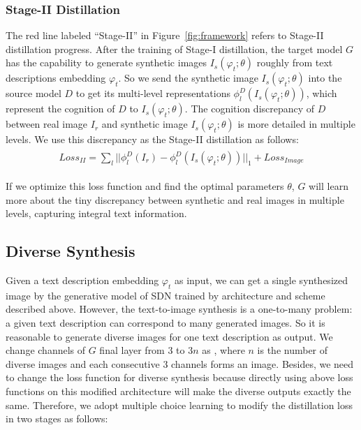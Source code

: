 \documentclass[sigconf]{acmart}
\begin{document}
\subsubsection{Stage-II Distillation}
The red line labeled ``Stage-II'' in Figure~\ref{fig:framework} refers to Stage-II distillation progress. After the training of Stage-I distillation, the target model $G$ has the capability to generate synthetic images $I_s(\varphi_t;\theta)$ roughly from text descriptions embedding $\varphi_t$. So we send the synthetic image $I_s(\varphi_t;\theta)$ into the source model $D$ to get its multi-level representations $\phi_l^D(I_s(\varphi_t;\theta))$, which represent the cognition of $D$ to $I_s(\varphi_t;\theta)$. The cognition discrepancy of $D$ between real image $I_r$ and synthetic image $I_s(\varphi_t;\theta)$ is more detailed in multiple levels. We use this discrepancy as the Stage-II distillation as follows:
\begin{align}
	\begin{split}
		Loss_{II} = \sum_l || \phi_l^D(I_r) - \phi_l^D(I_s(\varphi_t;\theta)) ||_1 + Loss_{Image}
	\end{split}
\end{align}

If we optimize this loss function and find the optimal parameters $\theta$, $G$ will learn more about the tiny discrepancy between synthetic and real images in multiple levels, capturing integral text information.

\subsection{Diverse Synthesis}
Given a text description embedding $\varphi_t$ as input, we can get a single synthesized image by the generative model of SDN trained by architecture and scheme described above. However, the text-to-image synthesis is a one-to-many problem: a given text description can correspond to many generated images. So it is reasonable to generate diverse images for one text description as output. We change channels of $G$ final layer from $3$ to $3n$ as \cite{chen2017photographic}, where $n$ is the number of diverse images and each consecutive 3 channels forms an image. Besides, we need to change the loss function for diverse synthesis because directly using above loss functions on this modified architecture will make the diverse outputs exactly the same. Therefore, we adopt multiple choice learning \cite{guzman2012multiple} to modify the distillation loss in two stages as follows:
\end{document}

